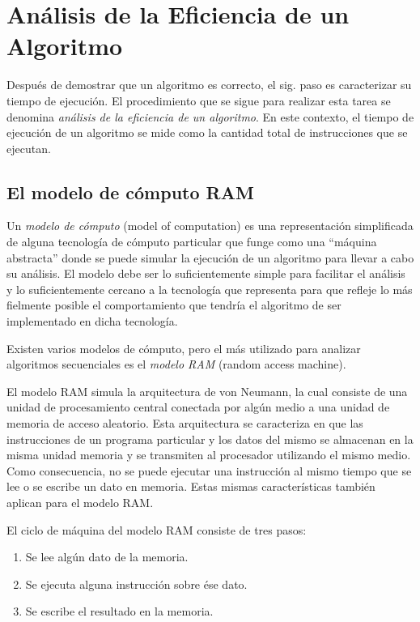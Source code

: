\chapter{Análisis de la Eficiencia de un Algoritmo}

Después de demostrar que un algoritmo es correcto, el sig. paso es
caracterizar su tiempo de ejecución. El procedimiento que se sigue
para realizar esta tarea se denomina \emph{análisis de la eficiencia 
de un algoritmo}. En este contexto, el tiempo de ejecución de
un algoritmo se mide como la cantidad total de instrucciones que se
ejecutan. 

\section{El modelo de cómputo RAM}

Un \emph{modelo de cómputo} (model of computation) es una
representación simplificada de alguna tecnología de cómputo particular
que funge como una ``máquina abstracta'' donde se puede simular
la ejecución de un algoritmo para llevar a cabo su análisis. El modelo
debe ser lo suficientemente simple para facilitar el análisis y lo
suficientemente cercano a la tecnología que representa para que refleje
lo más fielmente posible el comportamiento que tendría el algoritmo
de ser implementado en dicha tecnología. 

Existen varios modelos de cómputo, pero el más utilizado para analizar
algoritmos secuenciales es el \emph{modelo RAM }(random access machine). 

El modelo RAM simula la arquitectura de von Neumann, la cual consiste
de una unidad de procesamiento central conectada por algún medio a
una unidad de memoria de acceso aleatorio. Esta arquitectura se caracteriza
en que las instrucciones de un programa particular y los datos del
mismo se almacenan en la misma unidad memoria y se transmiten al procesador
utilizando el mismo medio. Como consecuencia, no se puede ejecutar
una instrucción al mismo tiempo que se lee o se escribe un dato en
memoria. Estas mismas características también aplican para el modelo
RAM.

El ciclo de máquina del modelo RAM consiste de tres pasos: 

\begin{enumerate}
    \item Se lee algún dato de la memoria. 
    \item Se ejecuta alguna instrucción sobre ése dato.
    \item Se escribe el resultado en la memoria. 
\end{enumerate}

